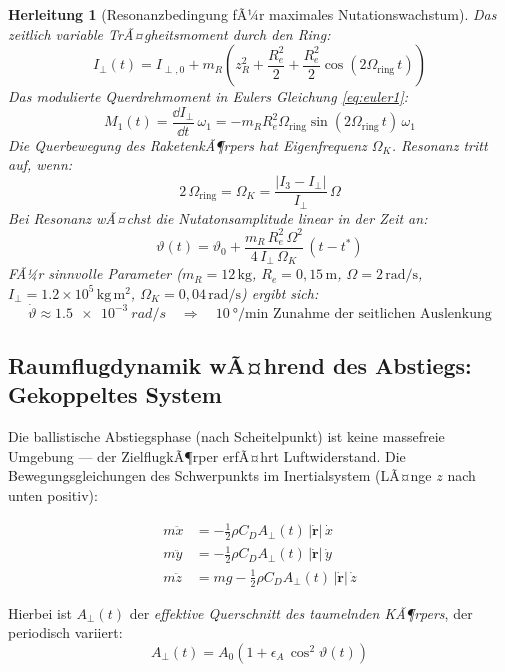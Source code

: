 ﻿\documentclass[12pt,a4paper]{article}
\newtheorem{herleitung}{Herleitung}[section]
\newcommand{\vek}[1]{\boldsymbol{#1}}
\begin{document}
\begin{herleitung}[Resonanzbedingung fÃ¼r maximales Nutationswachstum]
Das zeitlich variable TrÃ¤gheitsmoment durch den Ring:
\[
  I_\perp(t) = I_{\perp,0} + m_R\left(z_R^2 + \frac{R_e^2}{2}
    + \frac{R_e^2}{2}\cos(2\Omega_{\mathrm{ring}}\,t)\right)
\]
Das modulierte Querdrehmoment in Eulers Gleichung \eqref{eq:euler1}:
\[
  M_1(t) = \frac{\dd I_\perp}{\dd t}\,\omega_1
  = -m_R R_e^2 \Omega_{\mathrm{ring}}\sin(2\Omega_{\mathrm{ring}}\,t)\,\omega_1
\]
Die Querbewegung des RaketenkÃ¶rpers hat Eigenfrequenz $\Omega_K$.
Resonanz tritt auf, wenn:
\[
  \boxed{2\,\Omega_{\mathrm{ring}} = \Omega_K
  = \frac{|I_3 - I_\perp|}{I_\perp}\,\Omega}
\]
Bei Resonanz wÃ¤chst die Nutatonsamplitude linear in der Zeit an:
\[
  \vartheta(t) = \vartheta_0 + \frac{m_R\,R_e^2\,\Omega^2}{4\,I_\perp\,\Omega_K}\,(t-t^*)
\]
FÃ¼r sinnvolle Parameter ($m_R = 12\,\mathrm{kg}$, $R_e = 0{,}15\,\mathrm{m}$,
$\Omega = 2\,\mathrm{rad/s}$, $I_\perp = 1.2\times10^5\,\mathrm{kg\,m^2}$,
$\Omega_K = 0{,}04\,\mathrm{rad/s}$) ergibt sich:
\[
  \dot{\vartheta} \approx \SI{1.5e-3}{rad/s}
  \quad\Rightarrow\quad
  \SI{10}{\degree}/\text{min Zunahme der seitlichen Auslenkung}
\]
\end{herleitung}

\subsection{Raumflugdynamik wÃ¤hrend des Abstiegs: Gekoppeltes System}

Die ballistische Abstiegsphase (nach Scheitelpunkt) ist keine massefreie Umgebung ---
der ZielflugkÃ¶rper erfÃ¤hrt Luftwiderstand. Die Bewegungsgleichungen des Schwerpunkts
im Inertialsystem (LÃ¤nge $z$ nach unten positiv):

\begin{align}
  m\ddot{x} &= -\tfrac{1}{2}\rho C_D A_{\perp}(t)\,|\dot{\vek{r}}|\,\dot{x} \label{eq:traj_x}\\
  m\ddot{y} &= -\tfrac{1}{2}\rho C_D A_{\perp}(t)\,|\dot{\vek{r}}|\,\dot{y} \label{eq:traj_y}\\
  m\ddot{z} &= mg - \tfrac{1}{2}\rho C_D A_{\perp}(t)\,|\dot{\vek{r}}|\,\dot{z} \label{eq:traj_z}
\end{align}

Hierbei ist $A_{\perp}(t)$ der \emph{effektive Querschnitt des taumelnden KÃ¶rpers},
der periodisch variiert:
\[
  A_{\perp}(t) = A_0\left(1 + \epsilon_A\,\cos^2\!\vartheta(t)\right)
\]
\end{document}
